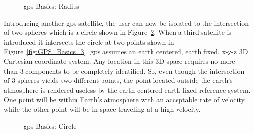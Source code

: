 \begin{figure}
  \centering
  \caption{\ac{gps} Basics: Radius}
	\label{fig:GPS_Basics_1}
\end{figure}

Introducing another \ac{gps} satellite, the user can now be isolated to the intersection of two spheres which is a circle shown in Figure~\ref{fig:GPS_Basics_2}. When a third satellite is introduced it intersects the circle at two points shown in Figure~\ref{fig:GPS_Basics_3}. \ac{gps} assumes an earth centered, earth fixed, x-y-z 3D Cartesian coordinate system. Any location in this 3D space requires no more than 3 components to be completely identified. So, even though the intersection of 3 spheres yields two different points, the point located outside the earth's atmosphere is rendered useless by the earth centered earth fixed reference system. One point will be within Earth's atmosphere with an acceptable rate of velocity while the other
point will be in space traveling at a high velocity.

\begin{figure}
	\centering
	\caption{\ac{gps} Basics: Circle}
	\label{fig:GPS_Basics_2}
\end{figure}


